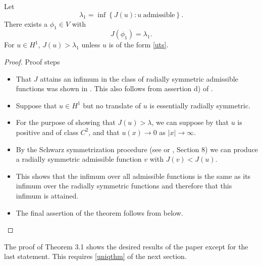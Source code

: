 \begin{theorem}%
Let
    $$\lambda_1 = \inf\left\{J(u): u~\text{admissible}\right\}.$$
    There exists a $\phi_1\in V$ %
    with 
    $$J(\phi_1)=\lambda_1.$$ 
    For $u\in H^1$, $J(u)>\lambda_1$ unless $u$ is of the form \eqref{uts}.
\end{theorem}
\begin{proof}
{\red Proof steps}
\begin{itemize}
    \item That $J$ attains an infimum in the class of radially symmetric
        admissible functions was shown in \cite{nehari}. This also follows from
        assertion d) of .
    \item Suppose that $u\in H^1$ but no translate of $u$ is essentially
        radially symmetric. 
    \item For the purpose of showing that $J(u) > \lambda$, we can suppose by
         that $u$ is positive and of class $C^2$, and that
        $u(x)\to 0$ as $|x|\to \infty$.
    \item By the Schwarz symmetrization procedure (see {} or {,
        Section 8}) we can produce a radially symmetric admissible function $v$
        with $J(v)<J(u)$.
    \item This shows that the infimum over all admissible functions is the same
        as its infimum over the radially symmetric functions and therefore that
        this infimum is attained. 
    \item The final assertion of the theorem follows
        from  below.
\end{itemize}
\end{proof}

The proof of Theorem 3.1 shows the desired results of the paper except for the
last statement. This requires \ref{uniqthm} of the next section.
